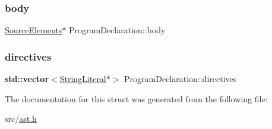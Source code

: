 \subsubsection{\texorpdfstring{body}{body}}
{\footnotesize\ttfamily \hyperlink{struct_source_elements}{Source\+Elements}$\ast$ Program\+Declaration\+::body}

\mbox{\label{struct_program_declaration_af9b771e9b488badcd0f1ccfee73afa4a}} 
\subsubsection{\texorpdfstring{directives}{directives}}
{\footnotesize\ttfamily \textbf{ std\+::vector}$<$\hyperlink{struct_string_literal}{String\+Literal}$\ast$$>$ Program\+Declaration\+::directives}



The documentation for this struct was generated from the following file\+:\begin{DoxyCompactItemize}
\item 
src/\hyperlink{ast_8h}{ast.\+h}\end{DoxyCompactItemize}
